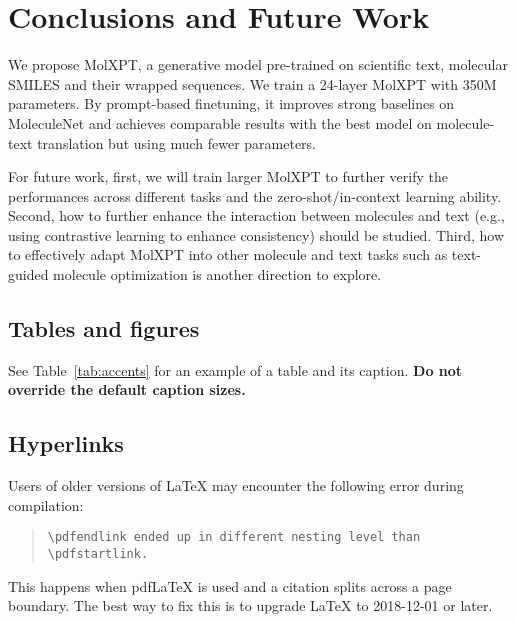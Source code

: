\documentclass[11pt]{article}
\newcommand{\ourM}{MolXPT}
\begin{document}
\begin{table}[!htbp]
\centering
{}
\caption{Zero-shot text-to-molecule generation.}
\label{tab:zeroshot_text2drug}
\end{table}

\section{Conclusions and Future Work}
We propose \ourM{},  a generative model pre-trained on scientific text, molecular SMILES and their wrapped sequences. We train a 24-layer \ourM{} with 350M parameters. By prompt-based finetuning, it improves strong baselines on MoleculeNet and achieves comparable results with the best model on molecule-text translation but using much fewer parameters.

For future work, first, we will train larger \ourM{} to further verify the performances across different tasks and the zero-shot/in-context \citep{xie2022an} learning ability. Second, how to further enhance the interaction between molecules and text (e.g., using contrastive learning to enhance consistency) should be studied. Third, how to effectively adapt \ourM{} into other molecule and text tasks such as text-guided molecule optimization is another direction to explore. 


\iffalse
\subsection{Tables and figures}

See Table~\ref{tab:accents} for an example of a table and its caption.
\textbf{Do not override the default caption sizes.}

\subsection{Hyperlinks}

Users of older versions of \LaTeX{} may encounter the following error during compilation: 
\begin{quote}
\tt\verb|\pdfendlink| ended up in different nesting level than \verb|\pdfstartlink|.
\end{quote}
This happens when pdf\LaTeX{} is used and a citation splits across a page boundary. The best way to fix this is to upgrade \LaTeX{} to 2018-12-01 or later.
\end{document}
